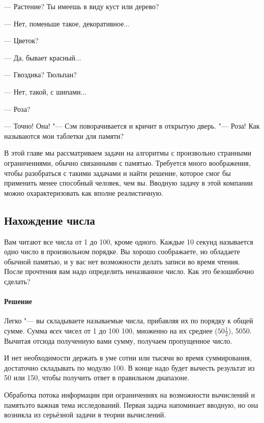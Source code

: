 \documentclass[twoside]{book}
\makeatletter
\newcommand{\rindex}[2][\imki@jobname]{%
  \index[#1]{\detokenize{#2}}%
}
\makeatother
\begin{document}
--- Растение? Ты имеешь в виду куст или дерево?

--- Нет, поменьше такое, декоративное...

--- Цветок?

--- Да, бывает красный...

--- Гвоздика? Тюльпан?

--- Нет, такой, с шипами...

--- Роза?

--- Точно! Она! "--- Сэм поворачивается и кричит в открытую дверь. "--- Роза! Как называются мои таблетки для памяти?

\medskip

В этой главе мы рассматриваем задачи на алгоритмы с произвольно странными ограничениями, обычно связанными с памятью.
Требуется много воображения, чтобы разобраться с такими задачами и найти решение, которое смог бы применить менее способный человек, чем вы.
Вводную задачу в этой компании можно охарактеризовать как вполне реалистичную.

\subsection*{Нахождение числа}%
\rindex{Нахождение числа}

Вам читают все числа от 1 до 100, кроме одного.
Каждые 10 секунд называется одно число в произвольном порядке.
Вы хорошо соображаете, но обладаете обычной памятью, и у вас нет возможности делать записи во время чтения.
После прочтения вам надо определить неназванное число.
Как это безошибочно сделать?

\paragraph{Решение} Легко "--- вы складываете называемые числа, прибавляя их по порядку к общей сумме.
Сумма \emph{всех} чисел от 1 до 100  100, множенно на их среднее ($50\tfrac12$),  5050.
Вычитая отсюда полученную вами сумму, получаем пропущенное число.

И нет необходимости держать в уме сотни или тысячи во время суммирования, достаточно складывать по модулю 100.
В конце надо будет вычесть результат из 50 или 150, чтобы получить ответ в правильном диапазоне.
\heart

Обработка потока информации при ограничениях на возможности вычислений и памятьэто важная тема исследований.
Первая задача напоминает вводную, но она возникла из серьёзной задачи в теории вычислений.
\end{document}
